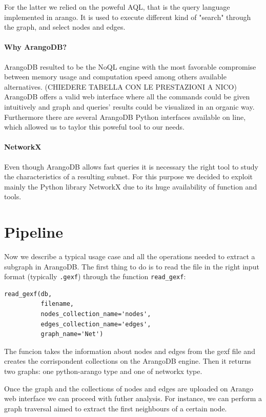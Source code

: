 \documentclass[11pt,twocolumn]{article}
\begin{document}
For the latter we relied on the poweful AQL, that is the query language implemented in arango. It is used to execute different kind of "search" through the graph, and select nodes and edges.

\paragraph{Why ArangoDB?}
ArangoDB resulted to be the NoQL engine with the most favorable compromise between memory usage and computation speed among others available alternatives. (CHIEDERE TABELLA CON LE PRESTAZIONI A NICO)
ArangoDB offers a valid web interface where all the commands could be given intuitively and graph and queries' results could be visualized in an organic way.
Furthermore there are several ArangoDB Python interfaces available on line, which allowed us to taylor this poweful tool to our needs.

\paragraph{NetworkX}
Even though ArangoDB allows fast queries it is necessary the right tool to study the characteristics of a resulting subnet. For this purpose we decided to exploit mainly the Python library NetworkX \cite{WEBSITE:networkx} due to its huge availability of function and tools.

\section{Pipeline}
Now we describe a typical usage case and all the operations needed to extract a subgraph in ArangoDB.
The first thing to do is to read the file in the right input format (typically \texttt{.gexf}) through the function \texttt{read\_gexf}:

\begin{verbatim}
read_gexf(db,
          filename,
          nodes_collection_name='nodes',
          edges_collection_name='edges',
          graph_name='Net')
\end{verbatim}

The funcion takes the information about nodes and edges from the gexf file and creates the corrispondent  collections on the ArangoDB engine. Then it returns two graphs: one python-arango type and one of networkx type.

Once the graph and the collections of nodes and edges are uploaded on Arango web interface we can proceed with futher analysis. For instance, we can perform a graph traversal aimed to extract the first neighbours of a certain node.
\end{document}
